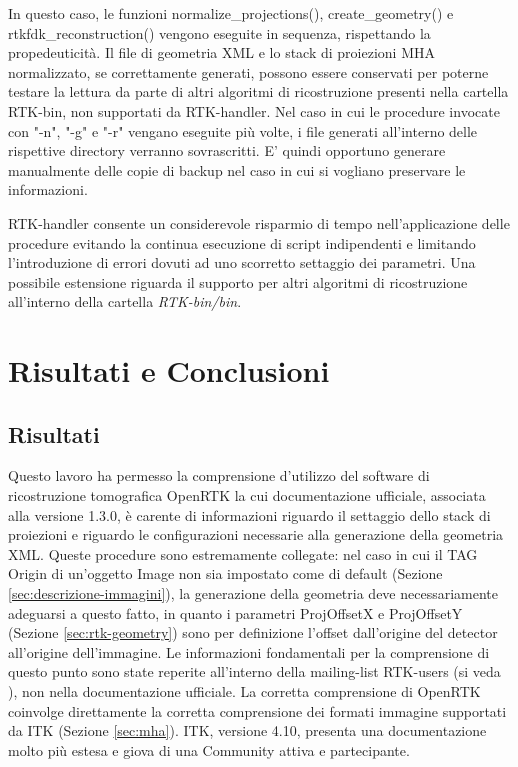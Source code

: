\documentclass[a4paper,12pt, doubleside]{report}
\begin{document}
                In questo caso, le funzioni normalize\_projections(), create\_geometry() e rtkfdk\_reconstruction() vengono eseguite in sequenza, rispettando la propedeuticità. Il file di geometria XML e lo stack di proiezioni MHA normalizzato, se correttamente generati, possono essere conservati per poterne testare la lettura da parte di altri algoritmi di ricostruzione presenti nella cartella RTK-bin, non supportati da RTK-handler. Nel caso in cui le procedure invocate con "-n", "-g" e "-r" vengano eseguite più volte, i file generati all'interno delle rispettive directory verranno sovrascritti. E' quindi opportuno generare manualmente delle copie di backup nel caso in cui si vogliano preservare le informazioni.
                
            \bigskip
            \par
                RTK-handler consente un considerevole risparmio di tempo nell'applicazione delle procedure evitando la continua esecuzione di script indipendenti e limitando l'introduzione di errori dovuti ad uno scorretto settaggio dei parametri. Una possibile estensione riguarda il supporto per altri algoritmi di ricostruzione all'interno della cartella \textit{RTK-bin/bin}.
            
    \chapter{Risultati e Conclusioni}
        \section{Risultati}
            \par
                Questo lavoro ha permesso la comprensione d'utilizzo del software di ricostruzione tomografica OpenRTK la cui documentazione ufficiale, associata alla versione 1.3.0, è carente di informazioni riguardo il settaggio dello stack di proiezioni e riguardo le configurazioni necessarie alla generazione della geometria XML. Queste procedure sono estremamente collegate: nel caso in cui il TAG Origin di un'oggetto Image non sia impostato come di default (Sezione \ref{sec:descrizione-immagini}), la generazione della geometria deve necessariamente adeguarsi a questo fatto, in quanto i parametri ProjOffsetX e ProjOffsetY (Sezione \ref{sec:rtk-geometry}) sono per definizione l'offset dall'origine del detector all'origine dell'immagine. Le informazioni fondamentali per la comprensione di questo punto sono state reperite all'interno della mailing-list RTK-users (si veda \cite{rtk-users-proj-offset}), non nella documentazione ufficiale. La corretta comprensione di OpenRTK coinvolge direttamente la corretta comprensione dei formati immagine supportati da ITK (Sezione \ref{sec:mha}). ITK, versione 4.10, presenta una documentazione molto più estesa e giova di una Community attiva e partecipante. 
            
\end{document}
